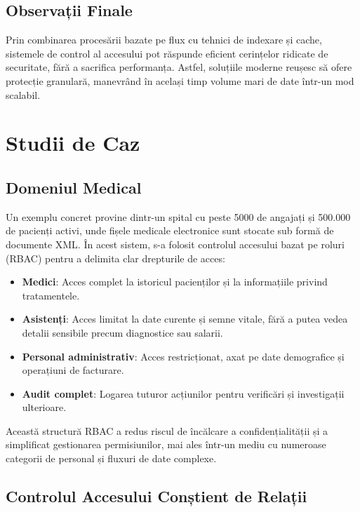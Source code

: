 \documentclass[runningheads]{llncs}
\begin{document}
\subsection{Observații Finale}

Prin combinarea procesării bazate pe flux cu tehnici de indexare și cache, sistemele de control al accesului pot răspunde eficient cerințelor ridicate de securitate, fără a sacrifica performanța. Astfel, soluțiile moderne reușesc să ofere protecție granulară, manevrând în același timp volume mari de date într-un mod scalabil.

\section{Studii de Caz}
\subsection{Domeniul Medical}

Un exemplu concret provine dintr-un spital cu peste 5000 de angajați și 500.000 de pacienți activi, unde fișele medicale electronice sunt stocate sub formă de documente XML. În acest sistem, s-a folosit controlul accesului bazat pe roluri (RBAC) pentru a delimita clar drepturile de acces:

\begin{itemize}
   \item \textbf{Medici}: Acces complet la istoricul pacienților și la informațiile privind tratamentele.
   \item \textbf{Asistenți}: Acces limitat la date curente și semne vitale, fără a putea vedea detalii sensibile precum diagnostice sau salarii.
   \item \textbf{Personal administrativ}: Acces restricționat, axat pe date demografice și operațiuni de facturare.
   \item \textbf{Audit complet}: Logarea tuturor acțiunilor pentru verificări și investigații ulterioare.
\end{itemize}

Această structură RBAC a redus riscul de încălcare a confidențialității și a simplificat gestionarea permisiunilor, mai ales într-un mediu cu numeroase categorii de personal și fluxuri de date complexe.

\subsection{Controlul Accesului Conștient de Relații}
\end{document}
